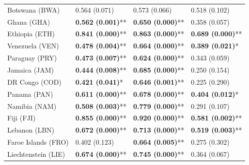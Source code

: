 \begin{longtable}{p{5cm}p{3cm}p{3cm}p{5cm}}
Botswana (BWA) & \textcolor{atlOrange600}{0.564 (0.071)} & \textcolor{atlOrange600}{0.573 (0.066)} & \textcolor{atlOrange600}{0.518 (0.102)} \\
Ghana (GHA) & \textcolor{atlLime600}{\textbf{0.562 (0.001)}**} & \textcolor{atlLime600}{\textbf{0.650 (0.000)}**} & \textcolor{atlOrange600}{0.358 (0.057)} \\
Ethiopia (ETH) & \textcolor{atlLime600}{\textbf{0.841 (0.000)}**} & \textcolor{atlLime600}{\textbf{0.863 (0.000)}**} & \textcolor{atlLime600}{\textbf{0.689 (0.000)}**} \\
Venezuela (VEN) & \textcolor{atlLime600}{\textbf{0.478 (0.004)}**} & \textcolor{atlLime600}{\textbf{0.664 (0.000)}**} & \textcolor{atlLime600}{\textbf{0.389 (0.021)}*} \\
Paraguay (PRY) & \textcolor{atlLime600}{\textbf{0.473 (0.007)}**} & \textcolor{atlLime600}{\textbf{0.624 (0.000)}**} & \textcolor{atlOrange600}{0.343 (0.059)} \\
Jamaica (JAM) & \textcolor{atlLime600}{\textbf{0.444 (0.008)}**} & \textcolor{atlLime600}{\textbf{0.685 (0.000)}**} & \textcolor{atlOrange600}{0.250 (0.154)} \\
DR Congo (COD) & \textcolor{atlLime600}{\textbf{0.421 (0.041)}*} & \textcolor{atlLime600}{\textbf{0.646 (0.001)}**} & \textcolor{atlOrange600}{0.225 (0.290)} \\
Panama (PAN) & \textcolor{atlLime600}{\textbf{0.611 (0.000)}**} & \textcolor{atlLime600}{\textbf{0.678 (0.000)}**} & \textcolor{atlLime600}{\textbf{0.404 (0.012)}*} \\
Namibia (NAM) & \textcolor{atlLime600}{\textbf{0.508 (0.003)}**} & \textcolor{atlLime600}{\textbf{0.779 (0.000)}**} & \textcolor{atlOrange600}{0.291 (0.107)} \\
Fiji (FJI) & \textcolor{atlLime600}{\textbf{0.855 (0.000)}**} & \textcolor{atlLime600}{\textbf{0.920 (0.000)}**} & \textcolor{atlLime600}{\textbf{0.581 (0.002)}**} \\
Lebanon (LBN) & \textcolor{atlLime600}{\textbf{0.672 (0.000)}**} & \textcolor{atlLime600}{\textbf{0.713 (0.000)}**} & \textcolor{atlLime600}{\textbf{0.519 (0.003)}**} \\
Faroe Islands (FRO) & \textcolor{atlOrange600}{0.402 (0.123)} & \textcolor{atlLime600}{\textbf{0.664 (0.005)}**} & \textcolor{atlOrange600}{0.275 (0.302)} \\
Liechtenstein (LIE) & \textcolor{atlLime600}{\textbf{0.674 (0.000)}**} & \textcolor{atlLime600}{\textbf{0.745 (0.000)}**} & \textcolor{atlOrange600}{0.364 (0.067)} \\

\end{longtable}
